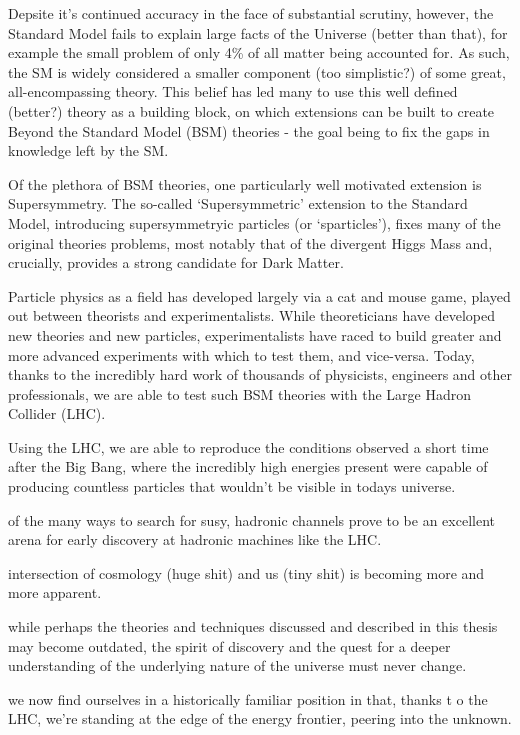 Depsite it's continued accuracy in the face of substantial scrutiny, however,
the Standard Model fails to explain large facts of the Universe (better than
that), for example the small problem of only 4\% of all matter being accounted
for. As such, the SM is widely considered a smaller component (too
simplistic?) of some great, all-encompassing theory. 
This belief has led many to use this well defined (better?) theory as a building
block, on which extensions can be built to create Beyond the Standard Model 
(BSM) theories - the goal being to fix the gaps in knowledge left by the SM.

Of the plethora of BSM theories, one particularly well motivated extension is
Supersymmetry. The so-called `Supersymmetric' extension to the Standard
Model, introducing supersymmetryic particles (or `sparticles'), fixes many of
the original theories problems, most notably that of the
divergent Higgs Mass and, crucially, provides a strong candidate for Dark
Matter.

Particle physics as a field has developed largely via a cat and mouse game,
played out between theorists and experimentalists. While theoreticians have
developed new theories and new particles, experimentalists have raced to build
greater and more advanced experiments with which to test them, and vice-versa.
Today, thanks to the incredibly hard work of thousands of physicists, engineers
and other professionals, we are able to test such BSM theories with the Large
Hadron Collider (LHC).

Using the LHC, we are able to reproduce the conditions observed a short time
after the Big Bang, where the incredibly high energies present were capable of
producing countless particles that wouldn't be visible in todays universe.

of the many ways to search for susy, hadronic channels prove to be an excellent
arena for early discovery at hadronic machines like the LHC.

intersection of cosmology (huge shit) and us (tiny shit) is becoming more and
more apparent.

while perhaps the theories and techniques discussed and described in this thesis
may become outdated, the spirit of discovery and the quest for a deeper
understanding of the underlying nature of the universe must never change.

we now find ourselves in a historically familiar position in that, thanks t
o the LHC, we're standing
at the edge of the energy frontier, peering into the unknown.
